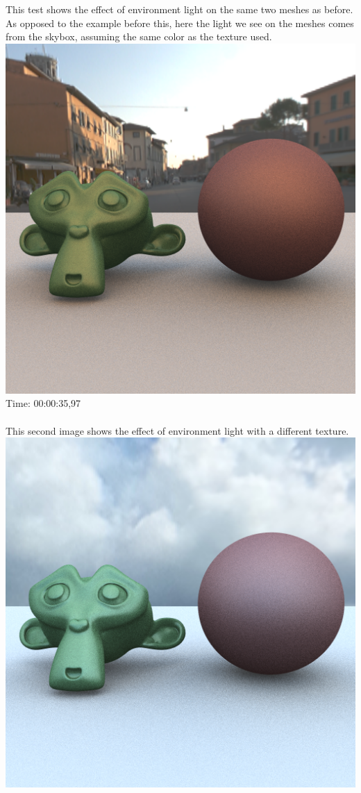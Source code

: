 \documentclass[12pt]{article} %
\begin{document}
This test shows the effect of environment light on the same two meshes as before. As opposed to the example before this, here the light we see on the meshes comes from the skybox, assuming the same color as the texture used.\\
\includegraphics[width=\linewidth]{Homework4/tests/03_env_correct.png}
Time: 00:00:35,97
\\\\
This second image shows the effect of environment light with a different texture.
\includegraphics[width=\linewidth]{Homework4/tests/03_env.png}
\end{document}
